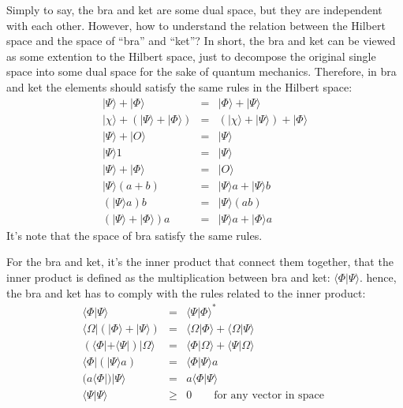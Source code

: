 Simply to say, the bra and ket are some dual space, but they are
independent with each other. However, how to understand the relation
between the Hilbert space and the space of ``bra'' and ``ket''? In
short, the bra and ket can be viewed as some extention to the Hilbert
space, just to decompose the original single space into some dual
space for the sake of quantum mechanics. Therefore, in bra and ket the
elements should satisfy the same rules in the Hilbert space:
\begin{eqnarray}
  |\Psi\rangle + |\Phi\rangle&=& |\Phi\rangle + |\Psi\rangle \nonumber \\
  |\chi\rangle + (|\Psi\rangle + |\Phi\rangle) &=&
  (|\chi\rangle + |\Psi\rangle) + |\Phi\rangle \nonumber \\
  |\Psi\rangle + |O\rangle &=& |\Psi\rangle \nonumber \\
  |\Psi\rangle1 &=& |\Psi\rangle \nonumber\\
  |\Psi\rangle + |\Phi\rangle &=& |O\rangle \nonumber\\
  |\Psi\rangle (a+b) &=& |\Psi\rangle a + |\Psi\rangle b \nonumber\\
  (|\Psi\rangle a)b &=& |\Psi\rangle (ab) \nonumber\\
  (|\Psi\rangle + |\Phi\rangle)a &=& |\Psi\rangle a + |\Phi\rangle a
\end{eqnarray}
It's note that the space of bra satisfy the same rules.

For the bra and ket, it's the inner product that connect them
together, that the inner product is defined as the multiplication
between bra and ket: $\langle\Phi|\Psi\rangle$. hence, the bra and ket
has to comply with the rules related to the inner product:
\begin{eqnarray}
  \langle\Phi|\Psi\rangle &=& \langle\Psi|\Phi\rangle^{*}      \nonumber\\
  \langle\Omega|(|\Phi\rangle+|\Psi\rangle) &=&
  \langle\Omega|\Phi\rangle + \langle\Omega|\Psi\rangle \nonumber \\
  (\langle\Phi|+\langle\Psi|)|\Omega\rangle &=&
  \langle\Phi|\Omega\rangle + \langle\Psi|\Omega\rangle \nonumber \\
  \langle\Phi|(|\Psi\rangle a) &=& \langle\Phi|\Psi\rangle a \nonumber \\
  (a\langle\Phi|)|\Psi\rangle  &=& a\langle\Phi|\Psi\rangle  \nonumber \\
  \langle\Psi|\Psi\rangle&\geq& 0 \qquad \text{for any vector in space }
\end{eqnarray}

